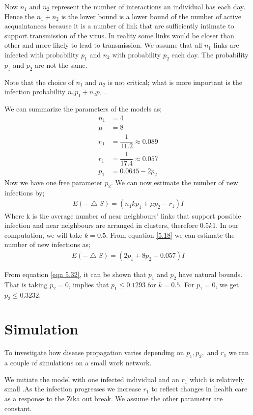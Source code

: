 Now $n_1$ and $n_2$ represent the number of interactions an individual has each day. Hence the  $n_1 + n_2$ is the lower bound is a lower bound of the number of active acquaintances because it is a number of link that are sufficiently intimate to support transmission of the virus. In reality some links would be closer than other and more likely to lead to transmission. We assume that all $n_1$ links are infected with probability $p_1$ and $n_2$ with probability $p_2$ each day. The probability $p_1$ and $p_2$ are not the same.

Note that the choice of $n_1$ and $n_2$ is not critical; what is more important is the infection probability $n_1p_1 + n_2p_1$ .

We can summarize the parameters of the models as;
\begin{align}
n_1 &= 4 \\
\mu &= 8 \\
r_0 &= \dfrac{1}{11.2} \approx 0.089 \\
r_1 &= \dfrac{1}{17.4} \approx 0.057 \\
p_1 &= 0.0645 - 2 p_2 \label{eqn 5.1.7}
\end{align}
Now we have one free parameter $p_2$. We can now estimate the number of new infections by;
\begin{align}
E(- \bigtriangleup S) = (n_1 k p_1 + \mu p_2 - r_1) I \label{5.18}
\end{align}
Where k is the average number of near neighbours' links that support possible infection and near neighbours are arranged in clusters, therefore $0.5 k 1$.  In our computation, we will take $k = 0.5$. From equation \ref{5.18} we can estimate the number of new infections as;
\begin{align}
E(- \bigtriangleup S) = (2 p_1 + 8 p_2 - 0.057) I  \label{5.1.9}
\end{align}
 
From equation \ref{eqn 5.32}, it can be shown that $p_1$ and $p_2$ have natural bounds. That is taking $p_2 = 0$, implies that $p_1 \leq 0.1293$ for $k =0. 5$. For $p_1 = 0$, we get $p_2 \leq 0.3232$.
\section{Simulation}
To investigate how disease propagation varies depending on $p_1, p_2, $ and $r_1$ we ran a couple of simulations on a small work network. 

We initiate the model with one infected individual and an $r_1$ which is relatively small .As the  infection progresses  we increase $r_1$ to reflect changes in health care as a response to the Zika out break. We assume the other parameter are constant.